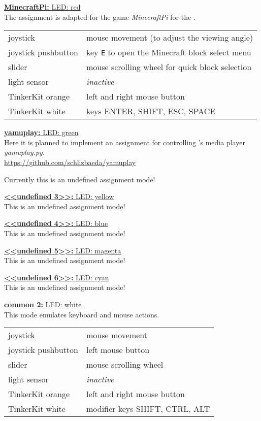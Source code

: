 	
\uline{\textbf{MinecraftPi: } LED: red}\\
The assignment is adapted for the game \textit{MinecraftPi} for the
\RPi.

\begin{tabular}{ll}
	joystick			&	mouse movement (to adjust the viewing angle)\\
	joystick pushbutton	&	key \texttt{E} to open the Minecraft block select menu\\
	slider				&	mouse scrolling wheel for quick block selection\\
	light sensor		&	\textit{inactive}\\
	TinkerKit orange	&	left and right mouse button\\
	TinkerKit white		&	keys ENTER, SHIFT, ESC, SPACE\\
\end{tabular}
	
	
\uline{\textbf{yamuplay: } LED: green}\\
Here it is planned to implement an assignment for controlling 
{\autor}'s media player \textit{yamuplay.py}.\\
\url{https://github.com/schlizbaeda/yamuplay}

Currently this is an undefined assignment mode!

\uline{\textbf{<<undefined 3>>: } LED: yellow}\\
This is an undefined assignment mode!

\uline{\textbf{<<undefined 4>>: } LED: blue}\\
This is an undefined assignment mode!

\uline{\textbf{<<undefined 5>>: } LED: magenta}\\
This is an undefined assignment mode!

\uline{\textbf{<<undefined 6>>: } LED: cyan}\\
This is an undefined assignment mode!

\uline{\textbf{common 2: } LED: white}\\
This mode emulates keyboard and mouse actions.

\begin{tabular}{ll}
	joystick			&	mouse movement\\
	joystick pushbutton	&	left mouse button\\
	slider				&	mouse scrolling wheel\\
	light sensor		&	\textit{inactive}\\
	TinkerKit orange	&	left and right mouse button\\
	TinkerKit white		&	modifier keys SHIFT, CTRL, ALT\\
\end{tabular}
